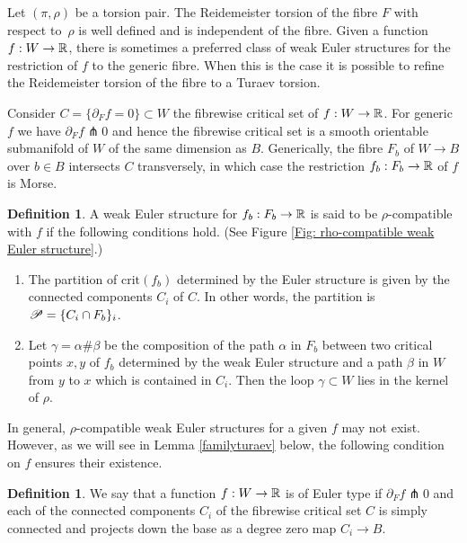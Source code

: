 \documentclass[11pt]{article}
\numberwithin{equation}{section}\providecommand{\dpl}{\displaystyle}
\newcommand{\crit}{\mathrm{crit}}
\theoremstyle{plain}
\theoremstyle{definition}
\newtheorem{definition}[theorem]{Definition}
\begin{document}
Let $(\pi,\rho)$ be a torsion pair. The Reidemeister torsion of the fibre $F$ with respect to~$\rho$ is well defined and is independent of the fibre. Given a function $f:W \to \mathbb{R}$, there is sometimes a preferred class of weak Euler structures for the restriction of $f$ to the generic fibre. When this is the case it is possible to refine the Reidemeister torsion of the fibre to a Turaev torsion.

Consider $C=\{ \partial_F f = 0 \} \subset W$ the fibrewise critical set of $f:W \to \mathbb{R}$. For generic $f$ we have $\partial_F f \pitchfork 0$ and hence the fibrewise critical set is a smooth orientable submanifold of $W$ of the same dimension as $B$. Generically, the fibre $F_b$ of $W \to B$ over $b \in B$ intersects $C$ transversely, in which case the restriction $f_b: F_b \to \mathbb{R}$ of $f$ is Morse.

\begin{definition}\label{def:317}
A weak Euler structure for $f_b:F_b \to \mathbb{R}$ is said to be $\rho$-compatible with $f$ if the following conditions hold. (See Figure \ref{Fig: rho-compatible weak Euler structure}.)
\begin{enumerate}
\item\label{def:3171}
The partition of $\crit(f_b)$ determined by the Euler structure is given by the connected components $C_i$ of $C$. In other words, the partition is $\mathscr{P}= \{ C_i \cap F_b \}_i$.
\item\label{def:3172}
Let $\gamma= \alpha \# \beta$ be the composition of the path $\alpha$ in $F_b$ between two critical points $x,y$ of $f_b$ determined by the weak Euler structure and a path $\beta$ in $W$ from $y$ to $x$ which is contained in $C_i$. Then the loop $\gamma \subset W$ lies in the kernel of $\rho$.
\end{enumerate}
\end{definition}

In general, $\rho$-compatible weak Euler structures for a given $f$ may not exist. However, as we will see in Lemma \ref{familyturaev} below, the following condition on $f$ ensures their existence.

\begin{definition}\label{Def: function euler}
We say that a function $f:W \to \mathbb{R}$ is of Euler type if $\partial_F f \pitchfork 0$ and each of the connected components $C_i$ of the fibrewise critical set $C$ is simply connected and projects down the base as a degree zero map $C_i \to B$.
\end{definition}
\end{document}
